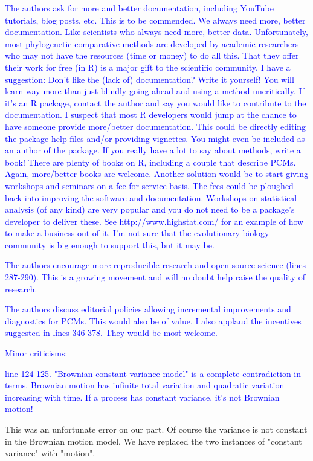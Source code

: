 \documentclass[12pt]{letter}
\begin{document}
\begin{letter}{}
\textcolor{blue}{The authors ask for more and better documentation, including YouTube tutorials, blog posts, etc. This is to be commended. We always need more, better documentation. Like scientists who always need more, better data. Unfortunately, most phylogenetic comparative methods are developed by academic researchers who may not have the resources (time or money) to do all this. That they offer their work for free (in R) is a major gift to the scientific community. I have a suggestion: Don't like the (lack of) documentation? Write it yourself! You will learn way more than just blindly going ahead and using a method uncritically. If it's an R package, contact the author and say you would like to contribute to the documentation. I suspect that most R developers would jump at the chance to have someone provide more/better documentation. This could be directly editing the package help files and/or providing vignettes. You  might even be included as an author of the package. If you really have a lot to say about methods, write a book! There are plenty of books on R, including a couple that describe PCMs. Again, more/better books are welcome. Another solution would be to start giving workshops and seminars on a fee for service basis. The fees could be ploughed back into improving the software and documentation. Workshops on statistical analysis (of any kind) are very popular and you do not need to be a package's developer to deliver these. See  http://www.highstat.com/ for an example of how to make a business out of it. I'm not sure that the evolutionary biology community is big enough to support this, but it may be.}

\textcolor{blue}{The authors encourage more reproducible research and open source science (lines 287-290). This is a growing movement and will no doubt help raise the quality of research.}

\textcolor{blue}{The authors discuss editorial policies allowing incremental improvements and diagnostics for PCMs. This would also be of value. I also applaud the incentives suggested in lines 346-378. They would be most welcome.}

\textcolor{blue}{Minor criticisms:}

\textcolor{blue}{line 124-125. "Brownian constant variance model" is a complete contradiction in terms. Brownian motion has infinite total variation and quadratic variation increasing with time. If a process has constant variance, it's not Brownian motion!}

This was an unfortunate error on our part. Of course the variance is not constant in the Brownian motion model. We have replaced the two instances of "constant variance" with "motion".


\end{letter}
\end{document}
